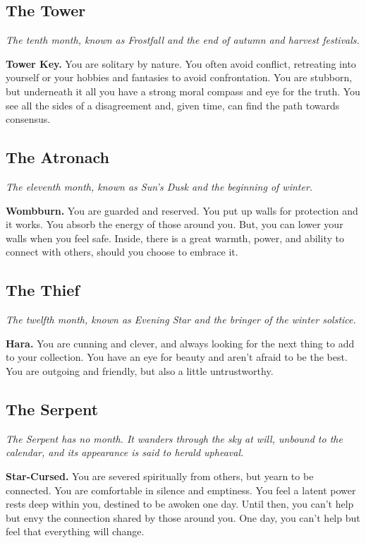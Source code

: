 \documentclass[12pt,letterpaper,twocolumn,openany,nodeprecatedcode,bg=none]{dndbook}
\let\oldsubsection\subsection
\renewcommand{\subsection}[1]{%
  \needspace{5\baselineskip}%
  \oldsubsection{#1}%
}
\begin{document}
\subsection{The Tower}\label{the-tower}

\emph{The tenth month, known as Frostfall and the end of autumn and
harvest festivals.}

\textbf{Tower Key.} You are solitary by nature. You often avoid
conflict, retreating into yourself or your hobbies and fantasies to
avoid confrontation. You are stubborn, but underneath it all you have a
strong moral compass and eye for the truth. You see all the sides of a
disagreement and, given time, can find the path towards consensus.

\subsection{The Atronach}\label{the-atronach}

\emph{The eleventh month, known as Sun's Dusk and the beginning of
winter.}

\textbf{Wombburn.} You are guarded and reserved. You put up walls for
protection and it works. You absorb the energy of those around you. But,
you can lower your walls when you feel safe. Inside, there is a great
warmth, power, and ability to connect with others, should you choose to
embrace it.

\subsection{The Thief}\label{the-thief}

\emph{The twelfth month, known as Evening Star and the bringer of the
winter solstice.}

\textbf{Hara.} You are cunning and clever, and always looking for the
next thing to add to your collection. You have an eye for beauty and
aren't afraid to be the best. You are outgoing and friendly, but also a
little untrustworthy.

\subsection{The Serpent}\label{the-serpent}

\emph{The Serpent has no month. It wanders through the sky at will,
unbound to the calendar, and its appearance is said to herald upheaval.}

\textbf{Star-Cursed.} You are severed spiritually from others, but yearn
to be connected. You are comfortable in silence and emptiness. You feel
a latent power rests deep within you, destined to be awoken one day.
Until then, you can't help but envy the connection shared by those
around you. One day, you can't help but feel that everything will
change.
\end{document}
